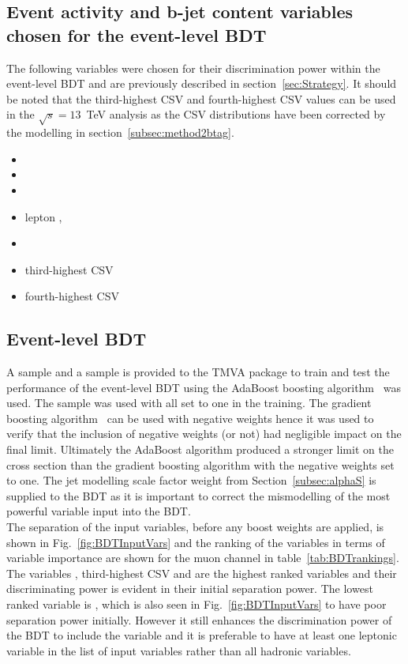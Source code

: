 \subsection{Event activity and b-jet content variables chosen for the event-level BDT}
The following variables were chosen for their discrimination power within the event-level BDT and are previously described in section~\ref{sec:Strategy}. It should be noted that the third-highest CSV and fourth-highest CSV values can be used in the $\sqrt{s} = 13$~TeV analysis as the CSV distributions have been corrected by the modelling in section~\ref{subsec:method2btag}.


\begin{multicols}{2}
\setlength{\columnseprule}{0pt} 

\begin{itemize}
\item \htb
\item \htrat
\item \njets
\item lepton \pt, \leadleppt
\item \njetsw
\item third-highest CSV
\item fourth-highest CSV
\end{itemize}

\end{multicols}

\subsection{Event-level BDT}
A \ttbar sample and a \tttt sample is provided to the TMVA package to train and test the performance of the event-level BDT using the AdaBoost boosting algorithm~\cite{FREUND1997119} was used. The \MADGRAPH\aMCATNLO \tttt sample was used with all  set to one in the training. The gradient boosting algorithm~\cite{mason1999boosting} can be used with negative weights hence it was used to verify that the inclusion of negative weights (or not) had negligible impact on the final limit. Ultimately the AdaBoost algorithm produced a stronger limit on the \tttt cross section than the gradient boosting algorithm with the negative weights set to one. The jet modelling scale factor weight from Section~\ref{subsec:alphaS} is supplied to the BDT as it is important to correct the mismodelling of the most powerful variable input into the BDT.\\
The separation of the input variables, before any boost weights are applied, is shown in Fig.~\ref{fig:BDTInputVars} and the ranking of the variables in terms of variable importance are shown for the muon channel in table~\ref{tab:BDTrankings}. The variables \njets, third-highest CSV and \htrat are the highest ranked variables and their discriminating power is evident in their initial separation power. The lowest ranked variable is \leadleppt, which is also seen in Fig.~\ref{fig:BDTInputVars} to have poor separation power initially. However it still enhances the discrimination power of the BDT to include the \leadleppt variable and it is preferable to have at least one leptonic variable in the list of input variables rather than all hadronic variables.



